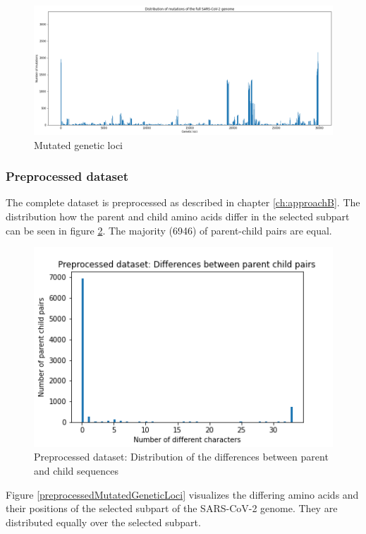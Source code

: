 \begin{figure}[ht!]
	\centering
	\includegraphics[width=1.0\linewidth]{figures/mutatedGeneticLoci.png}
	\caption{Mutated genetic loci \cite{own representation}}
	\label{mutatedGeneticLoci}
\end{figure}

\newpage
\subsubsection{Preprocessed dataset}  \label{ch:experimentsAb}

The complete dataset is preprocessed as described in chapter \ref{ch:approachB}. The distribution how the parent and child amino acids differ in the selected subpart can be seen in figure \ref{preprocessedDistributionDifferencesParentChild}. The majority (6946) of parent-child pairs are equal.

\begin{figure}[ht]
	\centering
	\includegraphics[width=0.6\linewidth]{figures/preprocessedDistributionDifferencesParentChild.png}
	\caption{Preprocessed dataset: Distribution of the differences between parent and child sequences \cite{own representation}}
	\label{preprocessedDistributionDifferencesParentChild}
\end{figure}

Figure \ref{preprocessedMutatedGeneticLoci} visualizes the differing amino acids and their positions of the selected subpart of the \ac{SARS-CoV-2} genome. They are distributed equally over the selected subpart.

